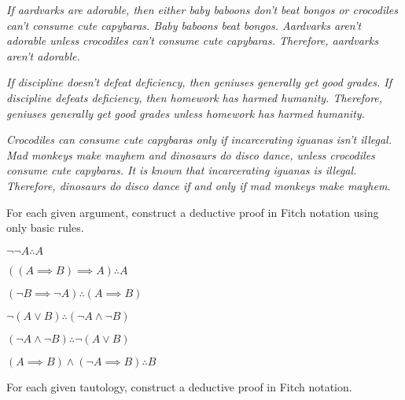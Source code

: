 \documentclass[a4paper,12pt]{article}
\begin{document}
\begin{tasks}
\begin{subtasks}
        \item \textit{If aardvarks are adorable, then either baby baboons don't beat bongos or crocodiles can't consume cute capybaras.
        Baby baboons beat bongos.
        Aardvarks aren't adorable unless crocodiles can't consume cute capybaras.
        Therefore, aardvarks aren't adorable.}

        \item \textit{If discipline doesn't defeat deficiency, then geniuses generally get good grades.
        If discipline defeats deficiency, then homework has harmed humanity.
        Therefore, geniuses generally get good grades unless homework has harmed humanity.}

        \item \textit{Crocodiles can consume cute capybaras only if incarcerating iguanas isn't illegal.
        Mad monkeys make mayhem and dinosaurs do disco dance, unless crocodiles consume cute capybaras.
        It is known that incarcerating iguanas is illegal.
        Therefore, dinosaurs do disco dance if and only if mad monkeys make mayhem.}
    \end{subtasks}


    \item For each given argument, construct a deductive proof in Fitch notation using only basic rules.

    \begin{multicols}{2}
    \begin{subtasks}
        \item $\neg\neg A \therefore A$
        \item $((A \implies B) \implies A) \therefore A$
        \item $(\neg B \implies \neg A) \therefore (A \implies B)$
        \item $\neg (A \lor B) \therefore (\neg A \land \neg B)$
        \item $(\neg A \land \neg B) \therefore \neg (A \lor B)$
        \item $(A \implies B) \land (\neg A \implies B) \therefore B$
    \end{subtasks}
    \end{multicols}


    \item For each given tautology, construct a deductive proof in Fitch notation.


\end{tasks}
\end{document}
